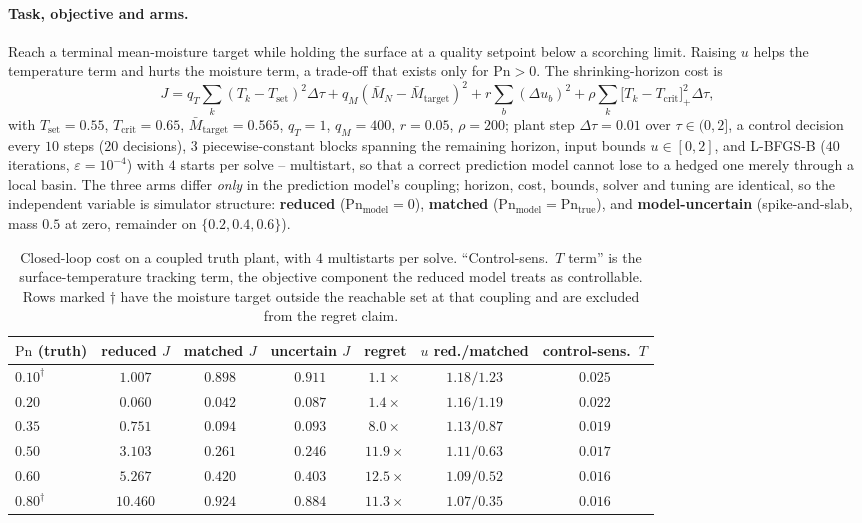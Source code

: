 \documentclass{article}
\begin{document}
\paragraph{Task, objective and arms.} Reach a terminal mean-moisture target while holding the surface
at a quality setpoint below a scorching limit. Raising $u$ helps the temperature term and hurts the
moisture term, a trade-off that exists only for $\mathrm{Pn}>0$. The shrinking-horizon cost is
\begin{equation}\label{eq:mpc}
J=q_T\!\sum_k (T_k-T_{\text{set}})^2\Delta\tau
+q_M (\bar M_N-\bar M_{\text{target}})^2
+r\!\sum_b (\Delta u_b)^2
+\rho\!\sum_k \bigl[T_k-T_{\text{crit}}\bigr]_+^2\Delta\tau ,
\end{equation}
with $T_{\text{set}}{=}0.55$, $T_{\text{crit}}{=}0.65$, $\bar M_{\text{target}}{=}0.565$,
$q_T{=}1$, $q_M{=}400$, $r{=}0.05$, $\rho{=}200$; plant step $\Delta\tau{=}0.01$ over
$\tau\in(0,2]$, a control decision every $10$ steps ($20$ decisions), $3$ piecewise-constant blocks
spanning the remaining horizon, input bounds $u\in[0,2]$, and L-BFGS-B ($40$ iterations,
$\varepsilon{=}10^{-4}$) with $4$ starts per solve -- multistart, so that a correct prediction model
cannot lose to a hedged one merely through a local basin. The three arms differ \emph{only} in the
prediction model's coupling; horizon, cost, bounds, solver and tuning are identical, so the
independent variable is simulator structure: \textbf{reduced} ($\mathrm{Pn}_{\text{model}}{=}0$),
\textbf{matched} ($\mathrm{Pn}_{\text{model}}{=}\mathrm{Pn}_{\text{true}}$), and
\textbf{model-uncertain} (spike-and-slab, mass $0.5$ at zero, remainder on $\{0.2,0.4,0.6\}$).

\begin{table}[h]\centering\small
\caption{Closed-loop cost on a coupled truth plant, with $4$ multistarts per solve. ``Control-sens.\
$T$ term'' is the surface-temperature tracking term, the objective component the reduced model treats
as controllable. Rows marked $\dagger$ have the moisture target outside the reachable set at that
coupling and are excluded from the regret claim.}
\label{tab:ctrl}
\begin{tabular}{lcccccc}\toprule
$\mathrm{Pn}$ (truth) & reduced $J$ & matched $J$ & uncertain $J$ & regret & $u$ red./matched & control-sens.\ $T$\\\midrule
$0.10^\dagger$ & $1.007$ & $0.898$ & $0.911$ & $1.1\times$ & $1.18 / 1.23$ & $0.025$\\
$0.20$ & $0.060$ & $0.042$ & $0.087$ & $1.4\times$ & $1.16 / 1.19$ & $0.022$\\
$0.35$ & $0.751$ & $0.094$ & $0.093$ & $\mathbf{8.0\times}$ & $1.13 / 0.87$ & $0.019$\\
$0.50$ & $3.103$ & $0.261$ & $0.246$ & $11.9\times$ & $1.11 / 0.63$ & $0.017$\\
$0.60$ & $5.267$ & $0.420$ & $0.403$ & $12.5\times$ & $1.09 / 0.52$ & $0.016$\\
$0.80^\dagger$ & $10.460$ & $0.924$ & $0.884$ & $11.3\times$ & $1.07 / 0.35$ & $0.016$\\
\bottomrule\end{tabular}
\end{table}
\end{document}
